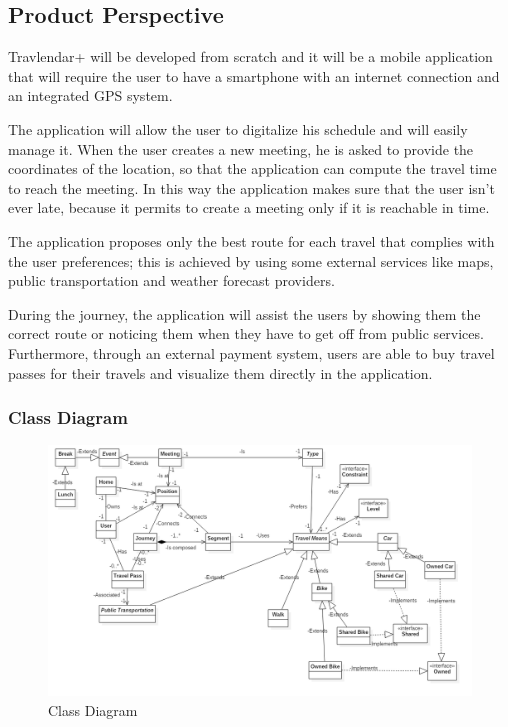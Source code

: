 \subsection{Product Perspective}
Travlendar+ will be developed from scratch and it will be a mobile application that will require the user to have a smartphone with an internet connection and an integrated GPS system.

The application will allow the user to digitalize his schedule and will easily manage it.
When the user creates a new meeting, he is asked to provide the coordinates of the location, so that the application can compute the travel time to reach the meeting.
In this way the application makes sure that the user isn't ever late, because it permits to create a meeting only if it is reachable in time.

The application proposes only the best route for each travel that complies with the user preferences; this is achieved by using some external services like maps, public transportation and weather forecast providers.

During the journey, the application will assist the users by showing them the correct route or noticing them when they have to get off from public services.
Furthermore, through an external payment system, users are able to buy travel passes for their travels and visualize them directly in the application.

\subsubsection{Class Diagram}
\begin{figure}[h]
\centering
\includegraphics[scale=0.45]{images/classdiagram}
\caption{Class Diagram}
\label{fig:classdiagram}
\end{figure}


